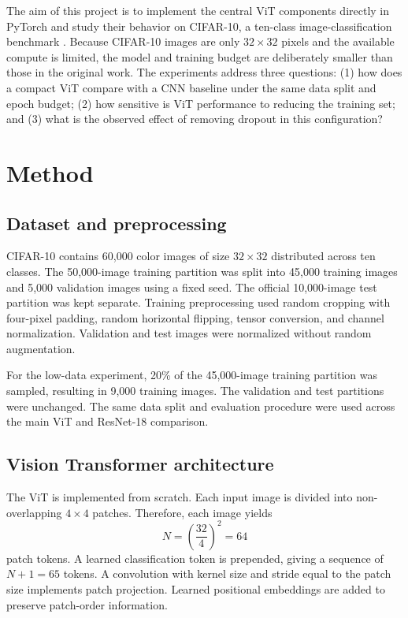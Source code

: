 \documentclass[conference]{IEEEtran}
\begin{document}
The aim of this project is to implement the central ViT components directly in PyTorch and study their behavior on CIFAR-10, a ten-class image-classification benchmark \cite{krizhevsky2009}. Because CIFAR-10 images are only $32 \times 32$ pixels and the available compute is limited, the model and training budget are deliberately smaller than those in the original work. The experiments address three questions: (1) how does a compact ViT compare with a CNN baseline under the same data split and epoch budget; (2) how sensitive is ViT performance to reducing the training set; and (3) what is the observed effect of removing dropout in this configuration?

\section{Method}
\subsection{Dataset and preprocessing}
CIFAR-10 contains 60,000 color images of size $32 \times 32$ distributed across ten classes. The 50,000-image training partition was split into 45,000 training images and 5,000 validation images using a fixed seed. The official 10,000-image test partition was kept separate. Training preprocessing used random cropping with four-pixel padding, random horizontal flipping, tensor conversion, and channel normalization. Validation and test images were normalized without random augmentation.

For the low-data experiment, 20\% of the 45,000-image training partition was sampled, resulting in 9,000 training images. The validation and test partitions were unchanged. The same data split and evaluation procedure were used across the main ViT and ResNet-18 comparison.

\subsection{Vision Transformer architecture}
The ViT is implemented from scratch. Each input image is divided into non-overlapping $4 \times 4$ patches. Therefore, each image yields
\begin{equation}
N = \left(\frac{32}{4}\right)^2 = 64
\end{equation}
patch tokens. A learned classification token is prepended, giving a sequence of $N+1=65$ tokens. A convolution with kernel size and stride equal to the patch size implements patch projection. Learned positional embeddings are added to preserve patch-order information.
\end{document}
